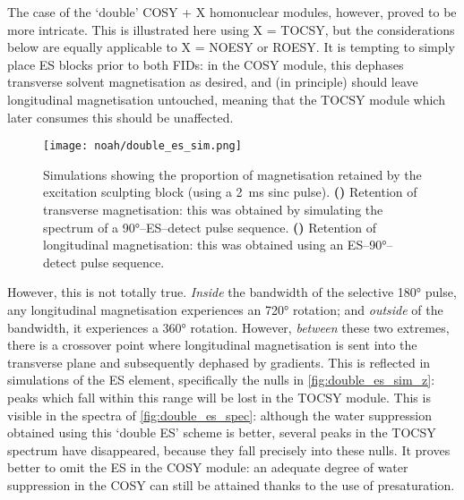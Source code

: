 The case of the `double' COSY + X homonuclear modules, however, proved to be more intricate.
This is illustrated here using X = TOCSY, but the considerations below are equally applicable to X = NOESY or ROESY.
It is tempting to simply place ES blocks prior to both FIDs: in the COSY module, this dephases transverse solvent magnetisation as desired, and (in principle) should leave longitudinal magnetisation untouched, meaning that the TOCSY module which later consumes this should be unaffected.

\begin{figure}[!ht]
    \centering
    \texttt{[image: noah/double\_es\_sim.png]}%
    {\label{fig:double_es_sim_xy}}%
    {\label{fig:double_es_sim_z}}%
    \caption[Simulation of magnetisation retained by excitation sculpting block]{
        Simulations showing the proportion of magnetisation retained by the excitation sculpting block (using a \qty{2}{\ms} sinc pulse).
        \textbf{()} Retention of transverse magnetisation: this was obtained by simulating the spectrum of a \ang{90}--ES--detect pulse sequence.
        \textbf{()} Retention of longitudinal magnetisation: this was obtained using an ES--\ang{90}--detect pulse sequence.
    }
    \label{fig:double_es_sim}
\end{figure}

However, this is not totally true.
\textit{Inside} the bandwidth of the selective \ang{180} pulse, any longitudinal magnetisation experiences an \ang{720} rotation; and \textit{outside} of the bandwidth, it experiences a \ang{360} rotation.
However, \textit{between} these two extremes, there is a crossover point where longitudinal magnetisation is sent into the transverse plane and subsequently dephased by gradients.
This is reflected in simulations of the ES element, specifically the nulls in \cref{fig:double_es_sim_z}: peaks which fall within this range will be lost in the TOCSY module.
This is visible in the spectra of \cref{fig:double_es_spec}: although the water suppression obtained using this `double ES' scheme is better, several peaks in the TOCSY spectrum have disappeared, because they fall precisely into these nulls.
It proves better to omit the ES in the COSY module: an adequate degree of water suppression in the COSY can still be attained thanks to the use of presaturation.


